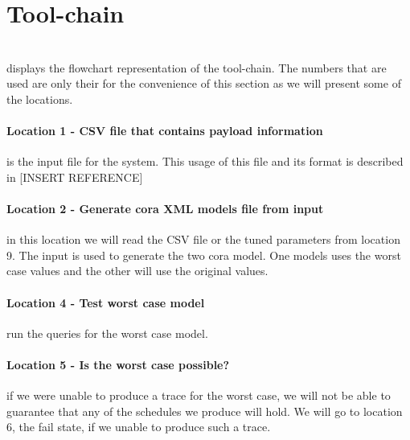 \section{Tool-chain} \label{sec:tool_chain}
\\
 displays the flowchart representation of the tool-chain. The numbers that are used are only their for the convenience of this section as we will present some of the locations. 

\paragraph{Location 1 - CSV file that contains payload information} is the input file for the system. This usage of this file and its format is described in [INSERT REFERENCE]

\paragraph{Location 2 - Generate \gls{cora} XML models file from input} in this location we will read the CSV file or the tuned parameters from location 9. The input is used to generate the two \gls{cora} model. One models uses the worst case values and the other will use the original values. 


\paragraph{Location 4 - Test worst case model} run the queries for the worst case model.

\paragraph{Location 5 - Is the worst case possible?} if we were unable to produce a trace for the worst case, we will not be able to guarantee that any of the schedules we produce will hold. We will go to location 6, the fail state, if we unable to produce such a trace.

